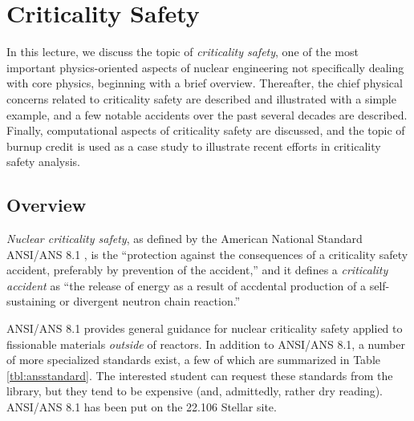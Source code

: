 \chapter{Criticality Safety}
\label{lec:criticalitysafety}

In this lecture, we discuss the topic of \textit{criticality safety}, one 
of the most important physics-oriented aspects of nuclear engineering not 
specifically dealing with core physics, beginning with a brief  
overview.  Thereafter, the chief physical concerns related to criticality 
safety are described and illustrated with a simple example, and a few 
notable 
accidents over the past several decades are described.  Finally, 
computational aspects of criticality safety are discussed, and the topic 
of burnup credit is used as a case study to illustrate recent efforts in 
criticality safety analysis.


\section*{Overview}

\textit{Nuclear criticality safety}, 
as defined by the American National Standard ANSI/ANS 8.1 \cite{ans8.1}, is 
the ``protection against the consequences of a criticality safety
accident, preferably by prevention of the accident,'' and it defines
a \textit{criticality accident} as ``the release of energy as a 
result of accdental production of a self-sustaining or
divergent neutron chain reaction.''

ANSI/ANS 8.1 provides general guidance for 
nuclear criticality safety applied to fissionable materials \textit{outside} 
of reactors.  In addition to ANSI/ANS 8.1, a number of more specialized 
standards exist, a few of which are 
summarized in Table \ref{tbl:ansstandard}. The interested 
student can request these standards from the library, but they tend to be 
expensive (and, admittedly, rather dry reading).  ANSI/ANS 8.1 has been
put on the 22.106 Stellar site.

